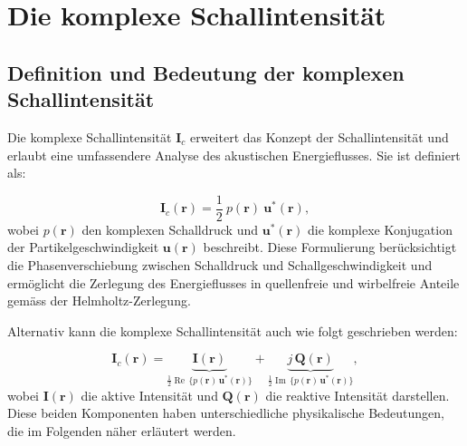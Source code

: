 %
%
%
%
\section{Die komplexe Schallintensität
\label{helmholtz:section:Schallintensitaet}}

\subsection{Definition und Bedeutung der komplexen Schallintensität
\label{helmholtz:subsection:def_Schallintensitaet}}

Die komplexe Schallintensität $\boldsymbol{I}_c$ erweitert das Konzept der Schallintensität und erlaubt eine umfassendere Analyse des akustischen Energieflusses. Sie ist definiert als:

\begin{equation}
\boldsymbol{I}_c (\boldsymbol{r}) = \frac{1}{2} \: p(\boldsymbol{r}) \: \boldsymbol{u}^{*}(\boldsymbol{r}),
\label{helmholtz:equationIntensitaetKomplex}
\end{equation}
wobei $p(\boldsymbol{r})$ den komplexen Schalldruck und $\boldsymbol{u}^{*}(\boldsymbol{r})$ die komplexe Konjugation der Partikelgeschwindigkeit $\boldsymbol{u}(\boldsymbol{r})$ beschreibt. Diese Formulierung berücksichtigt die Phasenverschiebung zwischen Schalldruck und Schallgeschwindigkeit und ermöglicht die Zerlegung des Energieflusses in quellenfreie und wirbelfreie Anteile gemäss der Helmholtz-Zerlegung.

Alternativ kann die komplexe Schallintensität auch wie folgt geschrieben werden:

\begin{equation}
\boldsymbol{I}_c (\boldsymbol{r}) = \underbrace{\boldsymbol{I}(\boldsymbol{r})}_{\frac{1}{2} \operatorname{Re} \, \{ p(\boldsymbol{r}) \, \boldsymbol{u}^*(\boldsymbol{r}) \}} + \underbrace{j\,\boldsymbol{Q}(\boldsymbol{r})}_{\frac{1}{2} \operatorname{Im} \, \{ p(\boldsymbol{r}) \, \boldsymbol{u}^*(\boldsymbol{r}) \}},
\label{helmholtz:equationIntensitaetKomplex_2}
\end{equation}  
wobei $\boldsymbol{I}(\boldsymbol{r})$ die aktive Intensität und $\boldsymbol{Q}(\boldsymbol{r})$ die reaktive Intensität darstellen. Diese beiden Komponenten haben unterschiedliche physikalische Bedeutungen, die im Folgenden näher erläutert werden.

